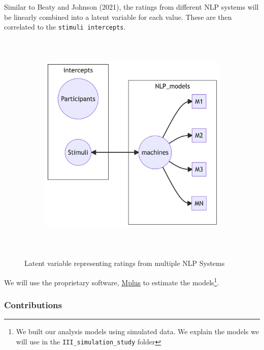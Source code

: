 \documentclass[
  letterpaper,
  DIV=11,
  numbers=noendperiod]{scrartcl}
\begin{document}
Similar to Beaty and Johnson (2021), the ratings from different NLP
systems will be linearly combined into a latent variable for each value.
These are then correlated to the \texttt{stimuli\ intercepts}.

\begin{figure}

{\centering 

\begin{figure}[H]

{\centering \includegraphics[width=4.53in,height=4.29in]{pre-registration_pdf_files/figure-latex/mermaid-figure-2.png}

}

\end{figure}

}

\caption{\label{fig-5}Latent variable representing ratings from multiple
NLP Systems}

\end{figure}

We will use the proprietary software,
\href{https://www.statmodel.com}{Mplus} to estimate the
models\footnote{We built our analysis models using simulated data. We
  explain the models we will use in the \texttt{III\_simulation\_study}
  folder}.

\hypertarget{contributions}{%
\subsubsection{Contributions}\label{contributions}}
\end{document}
